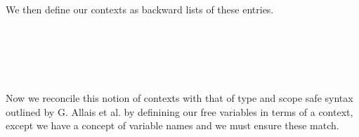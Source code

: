 We then define our contexts as backward lists of these entries.

\begin{code}%
\>[0]\AgdaSpace{}%
\AgdaSpace{}%
\AgdaSymbol{(}\AgdaSpace{}%
\AgdaSymbol{:}\AgdaSpace{}%
\AgdaSymbol{)}\AgdaSpace{}%
\AgdaSymbol{:}\AgdaSpace{}%
\AgdaSpace{}%
\<%
\\
\>[0][@{}l@{\AgdaIndent{0}}]%
\>[2]%
\>[8]\AgdaSymbol{:}\AgdaSpace{}%
\AgdaSpace{}%
\<%
\\
%
\>[2]\AgdaOperator{\AgdaInductiveConstructor{\AgdaUnderscore{}-,\AgdaUnderscore{}}}%
\>[8]\AgdaSymbol{:}\AgdaSpace{}%
\AgdaSpace{}%
\AgdaSpace{}%
\AgdaSpace{}%
\AgdaSpace{}%
\AgdaSpace{}%
\AgdaSpace{}%
\<%
\\
%
\\[\AgdaEmptyExtraSkip]%
\>[0]\AgdaSpace{}%
\AgdaSymbol{=}\AgdaSpace{}%
\AgdaSpace{}%
\<%
\end{code}

Now we reconcile this notion of contexts with that of type and scope safe
syntax outlined by G. Allais et al. \cite{DBLP:journals/corr/abs-2001-11001} by
definining our free variables in terms of a context, except we have a concept
of variable names and we must ensure these match.


